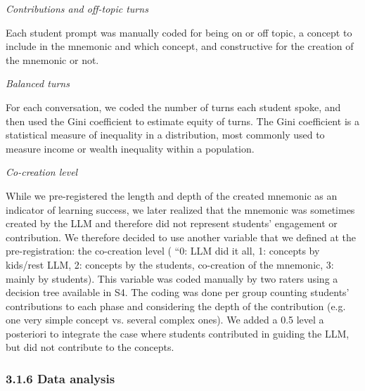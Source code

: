 \documentclass[fleqn,10pt]{wlscirep}
\begin{document}
\textit{Contributions and off-topic turns}

Each student prompt was manually coded for being on or off topic, a concept to include in the mnemonic and which concept, and constructive for the creation of the mnemonic or not.

\textit{Balanced turns}

For each conversation, we coded the number of turns each student spoke, and then used the Gini coefficient to estimate equity of turns. The Gini coefficient \cite{Dixon1987} is a statistical measure of inequality in a distribution, most commonly used to measure income or wealth inequality within a population.

\textit{Co-creation level}

While we pre-registered the length and depth of the created mnemonic as an indicator of learning success, we later realized that the mnemonic was sometimes created by the LLM and therefore did not represent students' engagement or contribution. We therefore decided to use another variable that we defined at the pre-registration: the co-creation level ( ``0: LLM did it all, 1: concepts by kids/rest LLM, 2: concepts by the students, co-creation of the mnemonic, 3: mainly by students). This variable was coded manually by two raters using a decision tree available in S4. The coding was done per group counting students' contributions to each phase and considering the depth of the contribution (e.g. one very simple concept vs. several complex ones). We added a 0.5 level a posteriori to integrate the case where students contributed in guiding the LLM, but did not contribute to the concepts.

\subsubsection*{3.1.6 Data analysis}
\end{document}

